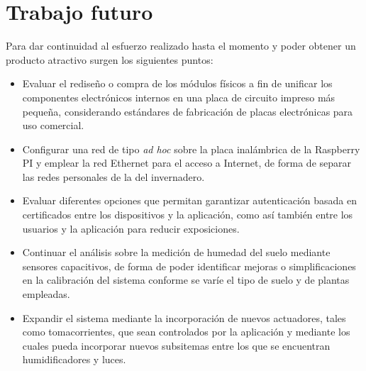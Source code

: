 \section{Trabajo futuro}

Para dar continuidad al esfuerzo realizado hasta el momento y poder obtener un
producto atractivo surgen los siguientes puntos:

\begin{itemize}
\item Evaluar el rediseño o compra de los módulos físicos a fin de unificar los componentes electrónicos internos en una placa de circuito impreso más pequeña, considerando estándares de fabricación de placas electrónicas para uso comercial.

\item Configurar una red de tipo \textit{ad hoc} sobre la placa inalámbrica de la Raspberry PI y emplear la red Ethernet para el acceso a Internet, de forma de separar las redes personales de la del invernadero.

\item Evaluar diferentes opciones que permitan garantizar autenticación basada en certificados entre los dispositivos y la aplicación, como así también entre los usuarios y la aplicación para reducir exposiciones.

\item Continuar el análisis sobre la medición de humedad del suelo mediante sensores capacitivos, de forma de poder identificar mejoras o simplificaciones en la calibración del sistema conforme se varíe el tipo de suelo y de plantas empleadas. 

\item Expandir el sistema mediante la incorporación de nuevos actuadores, tales como tomacorrientes, que sean controlados por la aplicación y mediante los cuales pueda incorporar nuevos subsitemas entre los que se encuentran humidificadores y luces. 

\end{itemize}